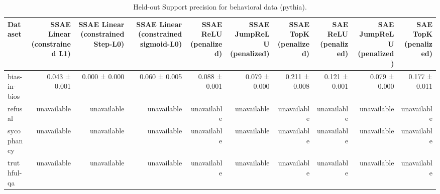 \begin{table}[t]
\centering
\caption{Held-out Support precision for behavioral data (pythia).}
\label{tab:behavioral-pythia-support-precision}
\begin{tabular}{lrrrrrrrrr}
\toprule
Dataset & SSAE Linear (constrained L1) & SSAE Linear (constrained Step-L0) & SSAE Linear (constrained sigmoid-L0) & SSAE ReLU (penalized) & SSAE JumpReLU (penalized) & SSAE TopK (penalized) & SAE ReLU (penalized) & SAE JumpReLU (penalized) & SAE TopK (penalized) \\
\midrule
bias-in-bios & 0.043 ± 0.001 & 0.000 ± 0.000 & 0.060 ± 0.005 & 0.088 ± 0.001 & 0.079 ± 0.000 & 0.211 ± 0.008 & 0.121 ± 0.001 & 0.079 ± 0.000 & 0.177 ± 0.011 \\
refusal & unavailable & unavailable & unavailable & unavailable & unavailable & unavailable & unavailable & unavailable & unavailable \\
sycophancy & unavailable & unavailable & unavailable & unavailable & unavailable & unavailable & unavailable & unavailable & unavailable \\
truthful-qa & unavailable & unavailable & unavailable & unavailable & unavailable & unavailable & unavailable & unavailable & unavailable \\
\bottomrule
\end{tabular}
\end{table}
